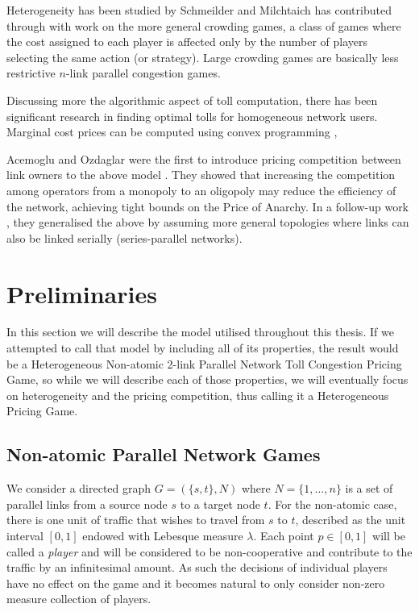 \documentclass[10pt,a4paper]{book}
\theoremstyle{definition}
\theoremstyle{comment}
\begin{document}
Heterogeneity has been studied by Schmeilder \cite{1973JSP.....7..295S} and Milchtaich \cite[Prop 3.3]{doi:10.1287/moor.25.3.349.12220} has contributed through with work on the more general crowding games, a class of games where the cost assigned to each player is affected only by the number of players selecting the same action (or strategy).
Large crowding games are basically less restrictive $n$-link parallel congestion games.

Discussing more the algorithmic aspect of toll computation, there has been significant research in finding optimal tolls for homogeneous network users.
Marginal cost prices can be computed using convex programming \cite{beckmann1956studies}, 

Acemoglu and Ozdaglar were the first to introduce pricing competition between link owners to the above model \cite{10.1287/moor.1060.0231}.
They showed that increasing the competition among operators from a monopoly to an oligopoly may reduce the efficiency of the network, achieving tight bounds on the Price of Anarchy.
In a follow-up work \cite{10.1109/JSAC.2007.070812}, they generalised the above by assuming more general topologies where links can also be linked serially (series-parallel networks).

\cleardoublepage


\chapter{Preliminaries}
\label{chapter:preliminaries}

In this section we will describe the model utilised throughout this thesis.
If we attempted to call that model by including all of its properties, the result would be a Heterogeneous Non-atomic 2-link Parallel Network Toll Congestion Pricing Game, so while we will describe each of those properties, we will eventually focus on heterogeneity and the pricing competition, thus calling it a Heterogeneous Pricing Game.

\section*{Non-atomic Parallel Network Games}

We consider a directed graph $G = (\{s, t\}, N)$ where $N = \{1,\dots, n\}$ is a set of parallel links from a source node $s$ to a target node $t$.
For the non-atomic case, there is one unit of traffic that wishes to travel from $s$ to $t$, described as the unit interval $[0, 1]$ endowed with Lebesque measure $\lambda$.
Each point $p \in [0, 1]$ will be called a \textit{player} and will be considered to be non-cooperative and contribute to the traffic by an infinitesimal amount.
As such the decisions of individual players have no effect on the game and it becomes natural to only consider non-zero measure collection of players.
\end{document}
